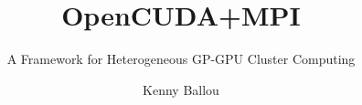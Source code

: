 \documentclass{beamer}
\title{OpenCUDA+MPI}
\subtitle{A Framework for Heterogeneous GP-GPU Cluster Computing}
\author[Ballou]{Kenny Ballou}
\begin{document}
\begin{frame}[label=titleslide]
\titlepage
\end{frame}
\begin{frame}
\tableofcontents
\end{frame}
\end{document}
